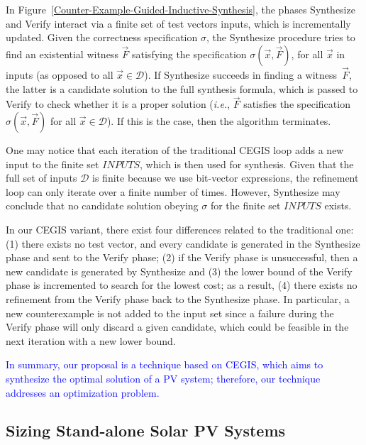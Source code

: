 \documentclass[runningheads]{llncs}
\begin{document}
In Figure~\ref{Counter-Example-Guided-Inductive-Synthesis}, the phases {\sc Synthesize} and {\sc Verify} interact via a finite set of test vectors {\sc inputs}, which is incrementally updated. Given the correctness specification $\sigma$, the {\sc Synthesize} procedure tries to find an existential witness $\vec{F}$ satisfying the specification $\sigma(\vec{x}, \vec{F})$, for all $\vec{x}$ in {\sc inputs} (as opposed to all $\vec{x} \in \mathcal{D}$). If {\sc Synthesize} succeeds in finding a witness~$\vec{F}$, the latter is a candidate solution to the full synthesis formula, which is passed to {\sc Verify} to check whether it is a proper solution ({\it i.e.}, $\vec{F}$ satisfies the specification $\sigma(\vec{x}, \vec{F})$ for all $\vec{x}\in\mathcal{D}$). If this is the case, then the algorithm terminates.

One may notice that each iteration of the traditional CEGIS loop adds a new input to the finite set $INPUTS$, which is then used for synthesis. Given that the full set of inputs $\mathcal{D}$ is finite because we use bit-vector expressions, the refinement loop can only iterate over a finite number of times. However, {\sc Synthesize} may conclude that no candidate solution obeying $\sigma$ for the finite set $INPUTS$ exists. 

In our CEGIS variant, there exist four differences related to the traditional one: 
(1) there exists no test vector, and every candidate is generated in the {\sc Synthesize} phase and sent to the {\sc Verify} phase; 
(2) if the {\sc Verify} phase is unsuccessful, then a new candidate is generated by {\sc Synthesize} and 
(3) the lower bound of the {\sc Verify} phase is incremented to search for the lowest cost; as a result,
(4) there exists no refinement from the {\sc Verify} phase back to the {\sc Synthesize} phase. In particular, a new counterexample is not added to the {\sc input} set since a failure during the {\sc Verify} phase will only discard a given candidate, which could be feasible in the next iteration with a new lower bound.

\textcolor{blue}{In summary, our proposal is a technique based on CEGIS, which aims to synthesize the optimal solution of a PV system; therefore, our technique addresses an optimization problem.}

\subsection{Sizing Stand-alone Solar PV Systems}
\label{sec:sizing}
\end{document}
